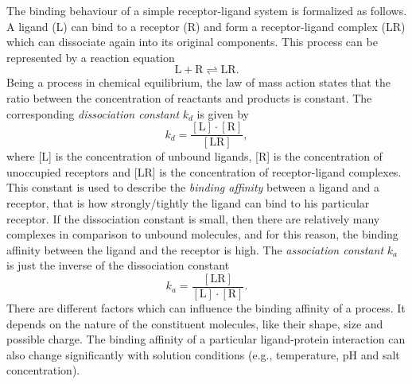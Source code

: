 The binding behaviour of a simple receptor-ligand system is formalized as follows. %
A ligand (L) can bind to a receptor (R) and form a receptor-ligand complex (LR) which can dissociate again into its original components. This process can be represented by a reaction equation
\begin{equation}
\label{eq:reaction}
\mathrm{L} + \mathrm{R} \rightleftharpoons \mathrm{LR}.
\end{equation}
Being a process in chemical equilibrium, the law of mass action states that the ratio between the concentration of reactants and products is constant.
The corresponding \textit{dissociation constant} $k_d$ is given by
\begin{equation*}
k_d = \frac{\mathrm{[L]} \cdot \mathrm{[R]}}{\mathrm{[LR]}},
\end{equation*}
where [L] is the concentration of unbound ligands, [R] is the concentration of unoccupied receptors and [LR]  is the concentration of receptor-ligand complexes.
This constant is used to describe the \textit{binding affinity} between a ligand and a receptor, that is how strongly/tightly the ligand can bind to his particular receptor. If the dissociation constant is small, then there are relatively many complexes in comparison to unbound molecules, and for this reason, the binding affinity between the ligand and the receptor is high.
The \textit{association constant} $k_a$ is just the inverse of the dissociation constant
\begin{equation*}
k_a = \frac{\mathrm{[LR]}}{\mathrm{[L]} \cdot \mathrm{[R]}}.
\end{equation*}
There are different factors which can influence the binding affinity of a process.
It depends on the nature of the constituent molecules, like their shape, size and possible charge.
The binding affinity of a particular ligand-protein interaction can also change significantly with solution conditions (e.g., temperature, pH and salt concentration).


